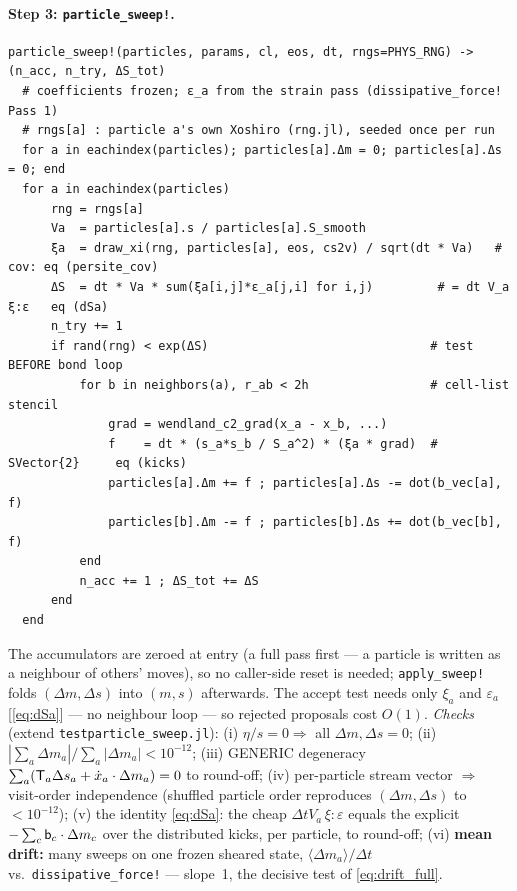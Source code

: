\documentclass[12pt,aps,preprint,nofootinbib,noshowkeys,noshowpacs,longbibliography,superscriptaddress,tightenlines]{revtex4-2}
\def\bbeta{{\sf b}}
\def\Teff{{\sf T}}
\begin{document}
\paragraph{Step 3: \texttt{particle\_sweep!}.}
\begin{lstlisting}
particle_sweep!(particles, params, cl, eos, dt, rngs=PHYS_RNG) -> (n_acc, n_try, ΔS_tot)
  # coefficients frozen; ε_a from the strain pass (dissipative_force! Pass 1)
  # rngs[a] : particle a's own Xoshiro (rng.jl), seeded once per run
  for a in eachindex(particles); particles[a].Δm = 0; particles[a].Δs = 0; end
  for a in eachindex(particles)
      rng = rngs[a]
      Va  = particles[a].s / particles[a].S_smooth
      ξa  = draw_xi(rng, particles[a], eos, cs2v) / sqrt(dt * Va)   # cov: eq (persite_cov)
      ΔS  = dt * Va * sum(ξa[i,j]*ε_a[j,i] for i,j)         # = dt V_a ξ:ε   eq (dSa)
      n_try += 1
      if rand(rng) < exp(ΔS)                               # test BEFORE bond loop
          for b in neighbors(a), r_ab < 2h                 # cell-list stencil
              grad = wendland_c2_grad(x_a - x_b, ...)
              f    = dt * (s_a*s_b / S_a^2) * (ξa * grad)  # SVector{2}     eq (kicks)
              particles[a].Δm += f ; particles[a].Δs -= dot(b_vec[a], f)
              particles[b].Δm -= f ; particles[b].Δs += dot(b_vec[b], f)
          end
          n_acc += 1 ; ΔS_tot += ΔS
      end
  end
\end{lstlisting}
The accumulators are zeroed at entry (a full pass first --- a particle is
written as a neighbour of others' moves), so no caller-side reset is needed;
\texttt{apply\_sweep!} folds $(\Delta m,\Delta s)$ into $(m,s)$ afterwards.
The accept test needs only $\xi_a$ and $\varepsilon_a$ [\eqref{eq:dSa}] --- no
neighbour loop --- so rejected proposals cost $O(1)$.
\emph{Checks} (extend \texttt{testparticle\_sweep.jl}):
(i) $\eta/s=0\Rightarrow$ all $\Delta m,\Delta s=0$;
(ii) $|\sum_a\Delta m_a|/\sum_a|\Delta m_a|<10^{-12}$;
(iii) GENERIC degeneracy
$\sum_a(\Teff_a\Delta s_a+\dot x_a\cdot\Delta m_a)=0$ to round-off;
(iv) per-particle stream vector $\Rightarrow$ visit-order independence
(shuffled particle order reproduces $(\Delta m,\Delta s)$ to $<10^{-12}$);
(v) the identity \eqref{eq:dSa}: the cheap
$\Delta t V_a\,\xi\!:\!\varepsilon$ equals the explicit
$-\sum_c\bbeta_c\cdot\Delta m_c$ over the distributed kicks, per particle, to
round-off;
(vi) \textbf{mean drift:} many sweeps on one frozen sheared state,
$\langle\Delta m_a\rangle/\Delta t$ vs.\ \texttt{dissipative\_force!} ---
slope~1, the decisive test of \eqref{eq:drift_full}.
\end{document}
